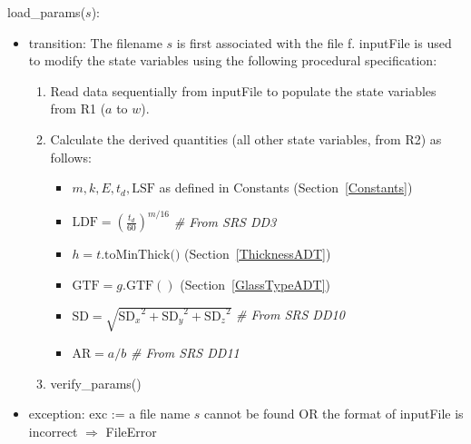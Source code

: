 \documentclass[12pt, titlepage]{article}
\begin{document}
\noindent load\_params($s$):
\begin{itemize}
\item transition: The filename $s$ is first associated with the file f.  {inputFile} is used to
  modify the state variables using the following procedural specification:
\begin{enumerate}
\item Read data sequentially from inputFile to populate the state variables from
  R1 ($a$ to $w$).
\item Calculate the derived quantities (all other state variables, from R2) as follows:
\begin{itemize}
\item $m, k, E, t_d, \mbox{LSF}$ as defined in Constants
  (Section~\ref{Constants})
\item $\text{LDF}=(\frac{t_d}{60})^{m/16}$ \textit{\# From SRS DD3}
\item $h = t.\mbox{toMinThick()}$ (Section~\ref{ThicknessADT})
\item $\mbox{GTF} = g.\mbox{GTF}()$ (Section~\ref{GlassTypeADT})
\item $\mbox{SD} = \sqrt{{\text{SD}_x}^2 + {\text{SD}_y}^2 + {\text{SD}_z}^2}$ \textit{\# From SRS DD10}
\item $\mbox{AR} = a/b$ \textit{\# From SRS DD11}
\end{itemize}
\item verify\_params()
\end{enumerate}

\item exception: exc := a file name $s$ cannot be found OR the format of
  inputFile is incorrect $\Rightarrow$  FileError
\end{itemize}
\end{document}
